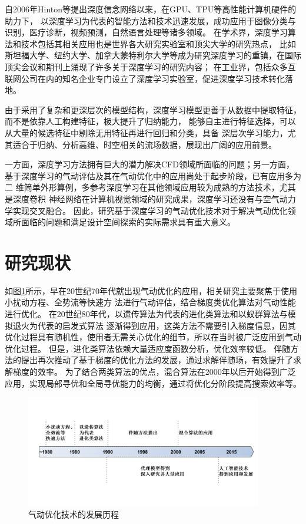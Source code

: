 自2006年Hinton等提出深度信念网络\cite{深度信念网络}以来，在GPU、TPU等高性能计算机硬件的助力下，
以深度学习为代表的智能方法和技术迅速发展，成功应用于图像分类与识别，医疗诊断，视频预测，自然语言处理等诸多领域。
在学术界，深度学习算法和技术包括其相关应用也是世界各大研究实验室和顶尖大学的研究热点，
比如斯坦福大学、纽约大学、加拿大蒙特利尔大学等成为研究深度学习的重镇，在国际顶尖会议和期刊上涌现了许多关于深度学习的研究内容；
在工业界，包括众多互联网公司在内的知名企业专门设立了深度学习实验室，促进深度学习技术转化落地。

由于采用了复杂和更深层次的模型结构，深度学习模型更善于从数据中提取特征，而不是依靠人工构建特征，极大提升了归纳能力，
能够自主进行特征选择，可以从大量的候选特征中剔除无用特征再进行回归和分类，具备
深层次学习能力，尤其适合于归纳、分析高维、时空相关的流场数据，展现出广阔的应用前景。

一方面，深度学习方法拥有巨大的潜力解决CFD领域所面临的问题；另一方面，
基于深度学习的气动评估及其在气动优化中的应用尚处于起步阶段，已有应用多为二
维简单外形算例，多参考深度学习在其他领域应用较为成熟的方法技术，尤其是深度卷积
神经网络在计算机视觉领域的研究成果，深度学习还没有与空气动力学实现交叉融合。
因此，研究基于深度学习的气动优化技术对于解决气动优化领域所面临的问题和满足设计空间探索的实际需求具有重大意义。



\section{研究现状}
如图\ref{fig:1}所示，早在20世纪70年代就出现气动优化的应用，相关研究主要聚焦于使用小扰动方程、全势流等快速方
法进行气动评估\cite{70年代1,70年代2}，结合梯度类优化算法对气动性能进行优化。
在20世纪80年代，以遗传算法为代表的进化类算法和以蚁群算法与模拟退火为代表的启发式算法
逐渐得到应用\cite{2000Aerodynamic,Genetic,Obayashi1995Genetic}，这类方法不需要引入梯度信息，因其优化过程具有随机性，使用者无需关心优化的细节，所以在当时被广泛应用到气动优化过程。
但是，进化类算法依赖大量适应度函数分析，优化效率较低。
伴随方法\cite{Jameson2000Aerodynamic}的提出再次推动了基于梯度的优化方法的发展，通过求解伴随场，有效提升了求解梯度的效率。
为了结合两类算法的优点，混合算法在2000年以后开始得到广泛应用，实现局部寻优和全局寻优能力的均衡，通过将优化分阶段提高搜索效率等。

\begin{figure}[htp]
	\centering
	\includegraphics[width=0.92\textwidth]{figures/develop.pdf}
	\caption{气动优化技术的发展历程}
	\label{fig:1}
\end{figure}

